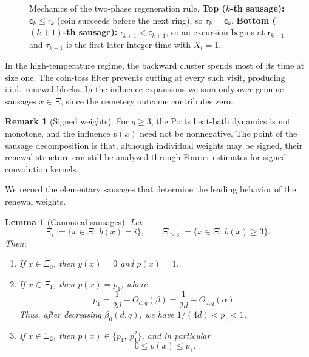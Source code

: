 \documentclass[letterpaper,11pt,reqno]{amsart}
\newtheorem{lemma}[thm]{Lemma}
\theoremstyle{definition}
\newtheorem{rmk}[thm]{Remark}
\begin{document}
\begin{figure}[htbp]
\caption{Mechanics of the two-phase regeneration rule. 
\textbf{Top ($k$-th sausage):} $\mathsf c_k\le \mathsf r_k$ (coin succeeds before the next ring), so $\tau_k=\mathsf c_k$.
\textbf{Bottom ($(k+1)$-th sausage):} $\mathsf r_{k+1}<\mathsf c_{k+1}$, so an excursion begins at $\mathsf r_{k+1}$ and $\tau_{k+1}$ is the first later integer time with $X_t=1$.
}
\label{fig:phase_mechanics}
\end{figure}

In the high-temperature  regime, the backward cluster spends most of its time at size one. The coin-toss filter prevents cutting at every such visit, producing i.i.d.\ renewal blocks.
In the influence expansions we sum only over genuine sausages $x\in\Xi$, since the cemetery outcome contributes zero.

\begin{rmk}[Signed weights]
For \(q\ge3\), the Potts heat-bath dynamics is not monotone, and the influence \(p(x)\) need
not be nonnegative. The point of the sausage decomposition is that, although individual weights
may be signed, their renewal structure can still be analyzed through Fourier estimates for signed
convolution kernels.
\end{rmk}

We record the elementary sausages that determine the leading behavior of the renewal weights.

\begin{lemma}[Canonical sausages]\label{lem:canonical-sausages}
Let
\[
\Xi_i:=\{x\in\Xi:\ b(x)=i\},
\qquad
\Xi_{\ge3}:=\{x\in\Xi:\ b(x)\ge3\}.
\]
Then:

\begin{enumerate}
\item If \(x\in\Xi_0\), then \(y(x)=0\) and \(p(x)=1\).

\item If \(x\in\Xi_1\), then \(p(x)=p_1\), where 
\[
p_1=\frac1{2d}+O_{d,q}(\beta)
=\frac1{2d}+O_{d,q}(\alpha).
\]
Thus, after decreasing \(\beta_0(d,q)\), we have \(1/(4d)<p_1<1\).

\item If \(x\in\Xi_2\), then
$p(x)\in\{p_1,\ p_1^2\}$,
and in particular
\begin{equation}\label{eq:p-two-branch}
0\le p(x)\le p_1.
\end{equation}
\end{enumerate}
\end{lemma}
\end{document}
